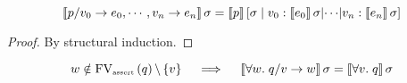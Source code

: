 \begin{enumcirc}
	\begin{property}
		\[
			\left\llbracket p/v_0 \rightarrow e_0, \cdots , v_n \rightarrow e_n \right\rrbracket\sigma =
			\left\llbracket p \right\rrbracket\left[ \sigma \; \middle\vert \; v_0 : \left\llbracket e_0 \right\rrbracket\sigma \middle\vert \cdots \middle\vert v_n : \left\llbracket e_n \right\rrbracket\sigma \right]
		\]
	\end{property}
	\begin{proof}
		By structural induction.
	\end{proof}

	\begin{property}
		\[
			w \notin \textrm{FV}_{\textrm{\tiny assert}}\left(  q  \right) \backslash \left\{ v \right\} \quad \implies \quad
			\left\llbracket \forall w .\; q / v \rightarrow w \right\rrbracket\sigma = \left\llbracket \forall v .\; q \right\rrbracket\sigma
		\]
	\end{property}

\end{enumcirc}